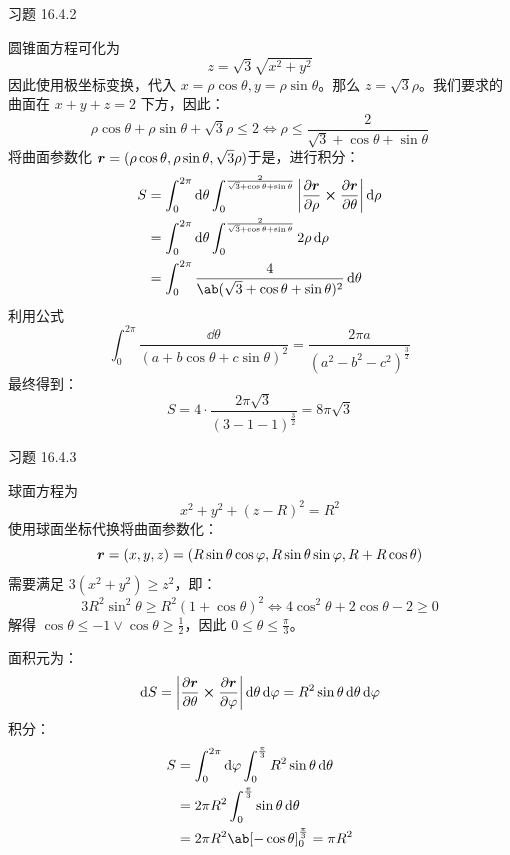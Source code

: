 \begin{problem}
	习题 16.4.2
	\begin{solution}
		圆锥面方程可化为
		$$
		z = \sqrt{3} \sqrt{x^2 + y^2}
		$$
		因此使用极坐标变换，代入 $x = \rho \cos \theta, y = \rho \sin \theta$。那么 $z = \sqrt{3} \rho$。我们要求的曲面在 $x + y + z = 2$ 下方，因此：
		$$
		\rho \cos \theta + \rho \sin \theta + \sqrt{3} \rho \le 2 \iff \rho \le \frac{2}{\sqrt{3} + \cos \theta + \sin \theta}
		$$
		将曲面参数化 $\boldsymbol{r} = (\rho \cos \theta, \rho \sin \theta, \sqrt{3} \rho)$于是，进行积分：
		$$
		\begin{aligned}
			S & = \int_{0}^{2\pi} \dd{\theta} \int_{0}^{\frac{2}{\sqrt{3} + \cos \theta + \sin \theta}} \abs{\pdv{\vect{r}}{\rho} \cp \pdv{\vect{r}}{\theta}} \dd{\rho} \\
			& = \int_{0}^{2\pi} \dd{\theta} \int_{0}^{\frac{2}{\sqrt{3} + \cos \theta + \sin \theta}} 2 \rho \dd{\rho} \\
			& = \int_{0}^{2\pi} \frac{4}{\ab(\sqrt{3} + \cos \theta + \sin \theta)^2} \dd{\theta}
		\end{aligned}
		$$
		利用公式
		$$
		\int_{0}^{2\pi} \frac{\dd{\theta}}{(a + b \cos \theta + c \sin \theta)^2} = \frac{2 \pi a}{(a^2 - b^2 - c^2)^{\frac{3}{2}}}
		$$
		最终得到：
		$$
		S = 4 \cdot \frac{2 \pi \sqrt{3}}{(3 - 1 - 1)^{\frac{3}{2}}} = 8 \pi \sqrt{3}
		$$
	\end{solution}
\end{problem}

\begin{problem}
	习题 16.4.3
	\begin{solution}
		球面方程为
		$$
		x^2 + y^2 + (z - R)^2 = R^2
		$$
		使用球面坐标代换将曲面参数化：
		$$
		\boldsymbol{r} = (x, y, z) = (R \sin \theta \cos \varphi, R \sin \theta \sin \varphi, R + R \cos \theta)
		$$
		需要满足 $3 (x^2 + y^2) \ge z^2$，即：
		$$
		3 R^2 \sin^2 \theta \ge R^2 (1 + \cos \theta)^2 \iff 4 \cos^2 \theta + 2 \cos \theta - 2 \ge 0
		$$
		解得 $\cos \theta \le -1 \lor \cos \theta \ge \frac{1}{2}$，因此 $0 \le \theta \le \frac{\pi}{3}$。

		面积元为：
		$$
		\dd{S} = \abs{\pdv{\vect{r}}{\theta} \cp \pdv{\vect{r}}{\varphi}} \dd{\theta} \dd{\varphi} = R^2 \sin \theta \dd{\theta} \dd{\varphi}
		$$
		积分：
		$$
		\begin{aligned}
			S & = \int_{0}^{2\pi} \dd{\varphi} \int_{0}^{\frac{\pi}{3}} R^2 \sin \theta \dd{\theta} \\
			& = 2 \pi R^2 \int_{0}^{\frac{\pi}{3}} \sin \theta \dd{\theta} \\
			& = 2 \pi R^2 \ab[- \cos \theta]_{0}^{\frac{\pi}{3}} = \pi R^2
		\end{aligned}
		$$
	\end{solution}
\end{problem}

